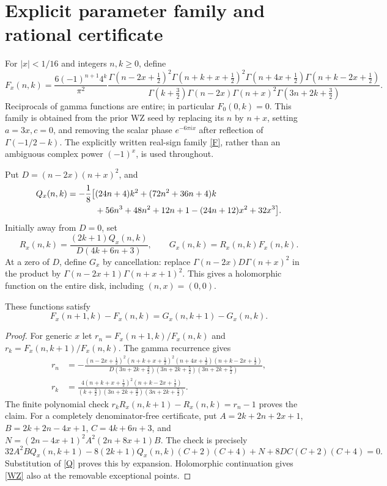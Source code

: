 \documentclass[11pt,a4paper]{article}
\begin{document}
\section{Explicit parameter family and rational certificate}
For $|x|<1/16$ and integers $n,k\ge0$, define
\begin{equation}\label{F}
 F_x(n,k)=\frac{6(-1)^{n+1}4^k}{\pi^2}
 \frac{\Gamma(n-2x+\tfrac12)^2\Gamma(n+k+x+\tfrac12)^2
 \Gamma(n+4x+\tfrac12)\Gamma(n+k-2x+\tfrac12)}
 {\Gamma(k+\tfrac32)\Gamma(n-2x)\Gamma(n+x)^2
 \Gamma(3n+2k+\tfrac32)}.
\end{equation}
Reciprocals of gamma functions are entire; in particular $F_0(0,k)=0$.
This family is obtained from the prior WZ seed
\cite[p.~17, (2.1)]{HS} by replacing its $n$ by $n+x$, setting $a=3x,c=0$,
and removing the scalar phase $e^{-6\pi i x}$ after reflection of
$\Gamma(-1/2-k)$. The explicitly written real-sign family \eqref{F}, rather
than an ambiguous complex power $(-1)^x$, is used throughout.

Put $D=(n-2x)(n+x)^2$, and
\begin{align}
 Q_x(n,k)=-\frac18\bigl[&(24n+4)k^2+(72n^2+36n+4)k\notag\\
 &+56n^3+48n^2+12n+1-(24n+12)x^2+32x^3\bigr].\label{Q}
\end{align}
Initially away from $D=0$, set
\begin{equation}\label{R}
 R_x(n,k)=\frac{(2k+1)Q_x(n,k)}{D(4k+6n+3)},\qquad
 G_x(n,k)=R_x(n,k)F_x(n,k).
\end{equation}
At a zero of $D$, define $G_x$ by cancellation: replace
$\Gamma(n-2x)D\Gamma(n+x)^2$ in the product by
$\Gamma(n-2x+1)\Gamma(n+x+1)^2$. This gives a holomorphic function on
the entire disk, including $(n,x)=(0,0)$.

\begin{lemma}\label{cert}
These functions satisfy
\begin{equation}\label{WZ}
 F_x(n+1,k)-F_x(n,k)=G_x(n,k+1)-G_x(n,k).
\end{equation}
\end{lemma}
\begin{proof}
For generic $x$ let $r_n=F_x(n+1,k)/F_x(n,k)$ and
$r_k=F_x(n,k+1)/F_x(n,k)$. The gamma recurrence gives
\begin{align*}
 r_n&=-\frac{(n-2x+\tfrac12)^2(n+k+x+\tfrac12)^2
 (n+4x+\tfrac12)(n+k-2x+\tfrac12)}
 {D(3n+2k+\tfrac32)(3n+2k+\tfrac52)(3n+2k+\tfrac72)},\\
 r_k&=\frac{4(n+k+x+\tfrac12)^2(n+k-2x+\tfrac12)}
 {(k+\tfrac32)(3n+2k+\tfrac32)(3n+2k+\tfrac52)}.
\end{align*}
The finite polynomial check $r_kR_x(n,k+1)-R_x(n,k)=r_n-1$
proves the claim. For a completely denominator-free certificate, put
$A=2k+2n+2x+1$, $B=2k+2n-4x+1$, $C=4k+6n+3$, and
$N=(2n-4x+1)^2A^2(2n+8x+1)B$. The check is precisely
\[
 32A^2B Q_x(n,k+1)-8(2k+1)Q_x(n,k)(C+2)(C+4)
 +N+8DC(C+2)(C+4)=0.
\]
Substitution of \eqref{Q} proves this by expansion. Holomorphic
continuation gives \eqref{WZ} also at the removable exceptional points.
\end{proof}
\end{document}
